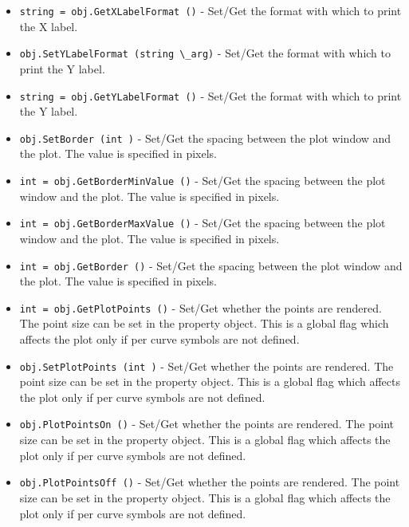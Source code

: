 \begin{itemize}
\item  \verb|string = obj.GetXLabelFormat ()| -  Set/Get the format with which to print the X label.

\item  \verb|obj.SetYLabelFormat (string \_arg)| -  Set/Get the format with which to print the Y label.

\item  \verb|string = obj.GetYLabelFormat ()| -  Set/Get the format with which to print the Y label.

\item  \verb|obj.SetBorder (int )| -  Set/Get the spacing between the plot window and the plot. The value
 is specified in pixels.

\item  \verb|int = obj.GetBorderMinValue ()| -  Set/Get the spacing between the plot window and the plot. The value
 is specified in pixels.

\item  \verb|int = obj.GetBorderMaxValue ()| -  Set/Get the spacing between the plot window and the plot. The value
 is specified in pixels.

\item  \verb|int = obj.GetBorder ()| -  Set/Get the spacing between the plot window and the plot. The value
 is specified in pixels.

\item  \verb|int = obj.GetPlotPoints ()| -  Set/Get whether the points are rendered.  The point size can be set in
 the property object. This is a global flag which affects the plot only 
 if per curve symbols are not defined.

\item  \verb|obj.SetPlotPoints (int )| -  Set/Get whether the points are rendered.  The point size can be set in
 the property object. This is a global flag which affects the plot only 
 if per curve symbols are not defined.

\item  \verb|obj.PlotPointsOn ()| -  Set/Get whether the points are rendered.  The point size can be set in
 the property object. This is a global flag which affects the plot only 
 if per curve symbols are not defined.

\item  \verb|obj.PlotPointsOff ()| -  Set/Get whether the points are rendered.  The point size can be set in
 the property object. This is a global flag which affects the plot only 
 if per curve symbols are not defined.


\end{itemize}
